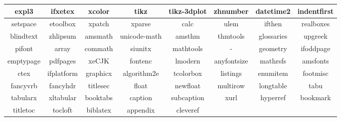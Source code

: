 

\begin{table}[h]
  \begin{tabular}{|c|c|c|c|c|c|c|c|}
  \hline
  expl3     & ifxetex    & xcolor   & tikz        & tikz-3dplot & zhnumber    & datetime2  & indentfirst \\ \hline
  setspace  & etoolbox   & xpatch   & xparse      & calc        & ulem        & ifthen     & realboxes   \\ \hline
  blindtext & zhlipsum   & amsmath  & unicode-math     & amsthm      & thmtools    & glossaries & upgreek     \\ \hline
  pifont    & array      & commath  & siunitx     & mathtools   & -    & geometry   & ifoddpage   \\ \hline
  emptypage & pdfpages   & xeCJK    & fontenc     & lmodern     & anyfontsize & mathrsfs   & amsfonts    \\ \hline
  ctex      & ifplatform & graphicx & algorithm2e & tcolorbox   & listings    & enumitem   & footmisc    \\ \hline
  fancyvrb  & fancyhdr   & titlesec & float       & newfloat    & multirow    & longtable  & tabu        \\ \hline
  tabularx  & xltabular  & booktabs & caption     & subcaption  & xurl        & hyperref   & bookmark    \\ \hline
  titletoc  & tocloft    & biblatex & appendix    & cleveref    &             &            &             \\ \hline
  \end{tabular}
\end{table}